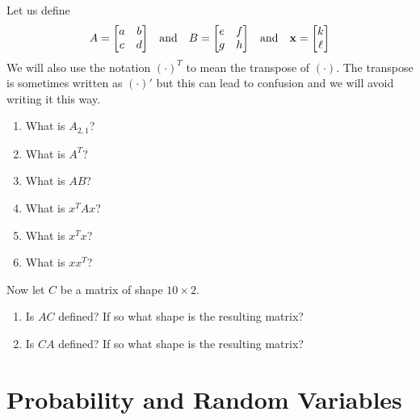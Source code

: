\documentclass[paper=letter, fontsize=11pt]{scrartcl}
\numberwithin{equation}{section}
\numberwithin{figure}{section}
\numberwithin{table}{section}
\begin{document}
Let us define
\begin{equation}
  A = \mqty[a & b \\ c & d] \qqtext{and} B= \mqty[e & f \\ g & h] \qqtext{and} \vb{x}=\mqty[k\\ \ell]
\end{equation}
We will also use the notation $(\cdot)^T$ to mean the transpose of $(\cdot)$.
The transpose is sometimes written as $(\cdot)'$ but this can lead to confusion and we will avoid writing it this way.
\begin{enumerate}[resume]
  \item What is $A_{2, 1}$?
  \item What is $A^T$?
  \item What is $AB$?
  \item What is $x^T A x$?
  \item What is $x^T x$?
  \item What is $x x^T$?
\end{enumerate}
Now let $C$ be a matrix of shape $10 \times 2$.
\begin{enumerate}[resume]
  \item Is $AC$ defined? If so what shape is the resulting matrix?
  \item Is $CA$ defined? If so what shape is the resulting matrix?
\end{enumerate}

\section{Probability and Random Variables}
\end{document}
